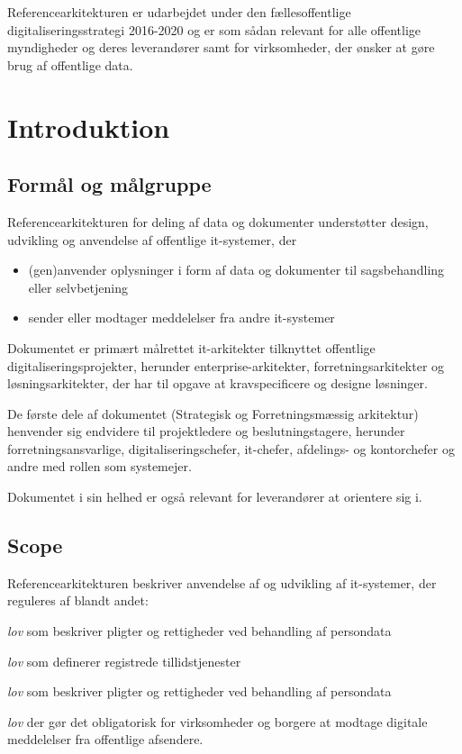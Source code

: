 Referencearkitekturen er udarbejdet under den fællesoffentlige
digitaliseringsstrategi 2016-2020 og er som sådan relevant for alle
offentlige myndigheder og deres leverandører samt for virksomheder, der
ønsker at gøre brug af offentlige data.

\section{Introduktion}\label{introduktion}

\subsection{Formål og målgruppe}\label{formuxe5l-og-muxe5lgruppe}

Referencearkitekturen for deling af data og dokumenter understøtter
design, udvikling og anvendelse af offentlige it-systemer, der

\begin{itemize}
\tightlist
\item
  (gen)anvender oplysninger i form af data og dokumenter til
  sagsbehandling eller selvbetjening
\item
  sender eller modtager meddelelser fra andre it-systemer
\end{itemize}

Dokumentet er primært målrettet it-arkitekter tilknyttet offentlige
digitaliseringsprojekter, herunder enterprise-arkitekter,
forretningsarkitekter og løsningsarkitekter, der har til opgave at
kravspecificere og designe løsninger.

De første dele af dokumentet (Strategisk og Forretningsmæssig
arkitektur) henvender sig endvidere til projektledere og
beslutningstagere, herunder forretningsansvarlige,
digitaliseringschefer, it-chefer, afdelings- og kontorchefer og andre
med rollen som systemejer.

Dokumentet i sin helhed er også relevant for leverandører at orientere
sig i.

\subsection{Scope}\label{scope}

Referencearkitekturen beskriver anvendelse af og udvikling af
it-systemer, der reguleres af blandt andet:

\begin{description}
\tightlist
\item[EU databeskyttelse]
\emph{lov} som beskriver pligter og rettigheder ved behandling af
persondata
\item[EU eIDAS]
\emph{lov} som definerer registrede tillidstjenester
\item[Persondatalov]
\emph{lov} som beskriver pligter og rettigheder ved behandling af
persondata
\item[Lov om Digital Post]
\emph{lov} der gør det obligatorisk for virksomheder og borgere at
modtage digitale meddelelser fra offentlige afsendere.
\end{description}

